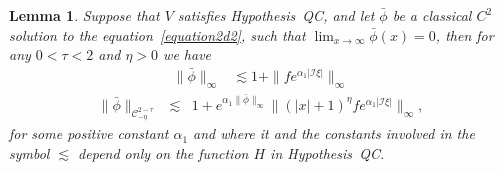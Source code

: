 \documentclass[a4paper,10pt]{article}
\newtheorem{lemma}[theorem]{Lemma}
\begin{document}
\begin{lemma}
  \label{lemma_bound}Suppose that $V$ satisfies Hypothesis~QC, and let
  $\bar{\phi}$ be a classical $C^2$ solution to the
  equation~{\eqref{equation2d2}}, such that $\lim_{x \rightarrow \infty}
  \bar{\phi} (x) = 0$, then for any $0 < \tau < 2$ and $\eta > 0$ we have
  \begin{equation}
    \begin{array}{ll}
      \| \bar{\phi} \|_{\infty} & \lesssim 1 +\|f e^{\alpha_1 | \mathcal{I}
      \xi |} \|_{\infty} \label{equationexistence2d1}
    \end{array}
  \end{equation}
  \begin{equation}
    \begin{array}{lll}
      \| \bar{\phi} \|_{\mathcal{C}_{- \eta}^{2 - \tau}} & \lesssim & 1 +
      e^{\alpha_1 \| \bar{\phi} \|_{\infty}} \| (| x | + 1)^{\eta} f
      e^{\alpha_1 | \mathcal{I} \xi |} \|_{\infty},
    \end{array} \label{equationexistence2d2}
  \end{equation}
  for some positive constant $\alpha_1$ and where it and the constants
  involved in the symbol $\lesssim$ depend only on the function $H$ in
  Hypothesis~QC.
\end{lemma}
\end{document}
